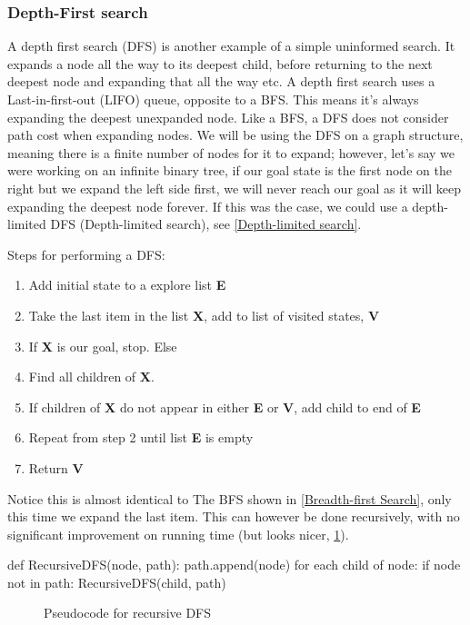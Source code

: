 \documentclass[]{final_report}
\begin{document}
\subsubsection{Depth-First search} 

A depth first search (DFS) is another example of a simple uninformed search. It expands a node all the way to its deepest child, before returning to the next deepest node and expanding that all the way etc. A depth first search uses a Last-in-first-out (LIFO) queue, opposite to a BFS. This means it's always expanding the deepest unexpanded node. Like a BFS, a DFS does not consider path cost when expanding nodes. We will be using the DFS on a graph structure, meaning there is a finite number of nodes for it to expand; however, let's say we were working on an infinite binary tree, if our goal state is the first node on the right but we expand the left side first, we will never reach our goal as it will keep expanding the deepest node forever. If this was the case, we could use a depth-limited DFS (Depth-limited search), see \ref{Depth-limited search}.

Steps for performing a DFS:
\begin{enumerate}
    \item Add initial state to a explore list \textbf{E}
    \item Take the last item in the list \textbf{X}, add to list of visited states, \textbf{V}
    \item If \textbf{X} is our goal, stop. Else
    \item Find all children of \textbf{X}.
    \item If children of \textbf{X} do not appear in either \textbf{E} or \textbf{V}, add child to end of \textbf{E}
    \item Repeat from step 2 until list \textbf{E} is empty
    \item Return \textbf{V}
\end{enumerate}

Notice this is almost identical to The BFS shown in \ref{Breadth-first Search}, only this time we expand the last item. This can however be done recursively, with no significant improvement on running time (but looks nicer, \ref{fig: recursive dfs}). 

\begin{verbbox}
def RecursiveDFS(node, path):
    path.append(node)
    for each child of node:
        if node not in path:
            RecursiveDFS(child, path)
\end{verbbox}
\begin{figure}[ht]
  \centering
  \theverbbox
  \caption{Pseudocode for recursive DFS}
  \label{fig: recursive dfs}
\end{figure}
\end{document}
